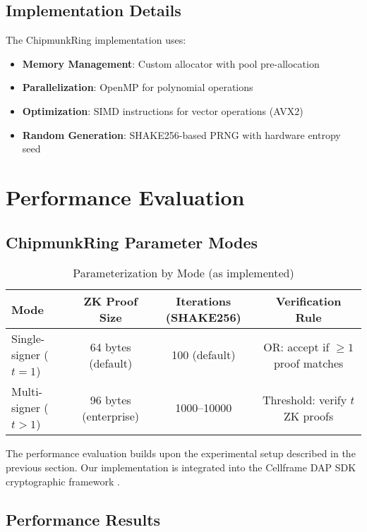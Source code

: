 \documentclass[11pt,a4paper]{article}
\begin{document}
\subsection{Implementation Details}

The ChipmunkRing implementation uses:

\begin{itemize}
\item \textbf{Memory Management}: Custom allocator with pool pre-allocation
\item \textbf{Parallelization}: OpenMP for polynomial operations
\item \textbf{Optimization}: SIMD instructions for vector operations (AVX2)
\item \textbf{Random Generation}: SHAKE256-based PRNG with hardware entropy seed
\end{itemize}

\section{Performance Evaluation}
\subsection{ChipmunkRing Parameter Modes}

\begin{table}[h]
\centering
\caption{Parameterization by Mode (as implemented)}
\label{tab:param-modes}
\begin{tabular}{@{}lccc@{}}
\toprule
Mode & ZK Proof Size & Iterations (SHAKE256) & Verification Rule \\
\midrule
Single-signer ($t=1$) & 64 bytes (default) & 100 (default) & OR: accept if $\ge 1$ proof matches \\
Multi-signer ($t>1$) & 96 bytes (enterprise) & 1000--10000 & Threshold: verify $t$ ZK proofs \\
\bottomrule
\end{tabular}
\end{table}


The performance evaluation builds upon the experimental setup described in the previous section. Our implementation is integrated into the Cellframe DAP SDK cryptographic framework \cite{cellframe2023, dapsdk2024}.

\subsection{Performance Results}
\end{document}
